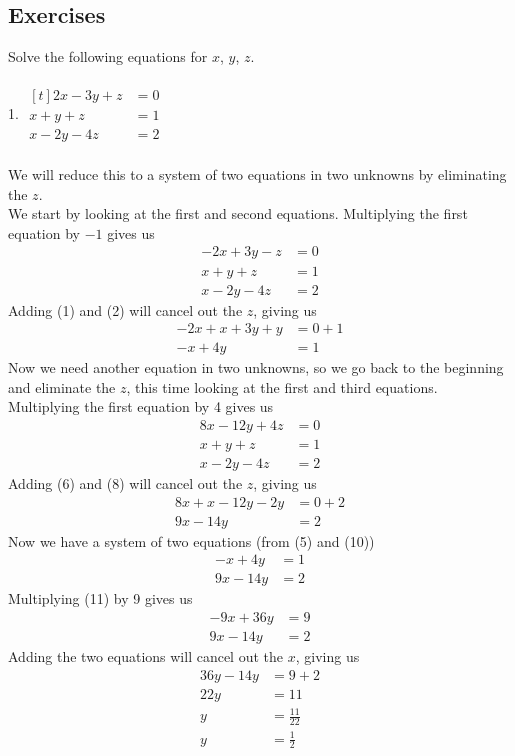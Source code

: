 \documentclass[12pt]{article}
\begin{document}
\subsection*{Exercises}
Solve the following equations for $x$, $y$, $z$. \\
\\
1. $\begin{aligned}[t]
2x-3y+z&=0 \\
x+y+z&=1 \\
x-2y-4z&=2
\end{aligned}$ \\
\\
We will reduce this to a system of two equations in two unknowns by eliminating the $z$. \\
We start by looking at the first and second equations. Multiplying the first equation by $-1$ gives us
\begin{align}
-2x+3y-z&=0 \\
x+y+z&=1 \\
x-2y-4z&=2
\end{align}
Adding (1) and (2) will cancel out the $z$, giving us
\begin{align}
-2x+x+3y+y&=0+1 \\
-x+4y&=1
\end{align}
Now we need another equation in two unknowns, so we go back to the beginning and eliminate the $z$, this time looking at the first and third equations. Multiplying the first equation by 4 gives us
\begin{align}
8x-12y+4z&=0 \\
x+y+z&=1 \\
x-2y-4z&=2
\end{align}
Adding (6) and (8) will cancel out the $z$, giving us
\begin{align}
8x+x-12y-2y&=0+2 \\
9x-14y&=2
\end{align}
Now we have a system of two equations (from (5) and (10))
\begin{align}
-x+4y&=1 \\
9x-14y&=2
\end{align}
Multiplying (11) by 9 gives us
\begin{align*}
-9x+36y&=9 \\
9x-14y&=2
\end{align*}
Adding the two equations will cancel out the $x$, giving us
\begin{align*}
36y-14y&=9+2 \\
22y&=11 \\
y&=\displaystyle \frac{11}{22} \\
y&=\displaystyle \frac{1}{2}
\end{align*}
\end{document}
